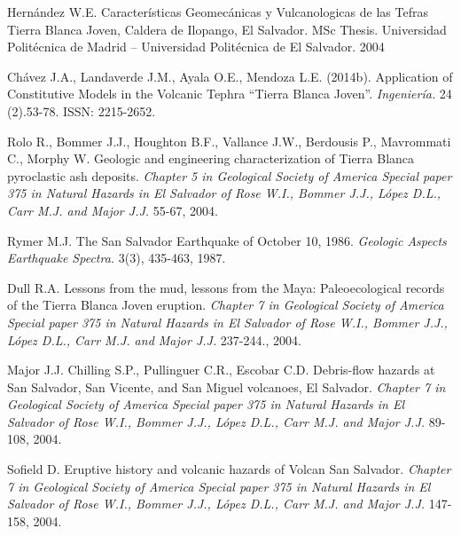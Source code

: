 \documentclass[11pt,twoside]{rmta2010esp}%
\begin{document}
\begin{thebibliography}{99}
Hern\'{a}ndez W.E.
\newblock Características Geomec\'{a}nicas y Vulcanologicas de las Tefras Tierra Blanca Joven, Caldera de Ilopango, El Salvador.
\newblock MSc Thesis. Universidad Politécnica de Madrid – Universidad Polit\'{e}cnica de El Salvador.
 2004


Chávez J.A.,  Landaverde J.M., Ayala O.E., Mendoza L.E. (2014b). 
\newblock Application of Constitutive Models in the Volcanic Tephra ``Tierra Blanca Joven''.
\newblock \emph{Ingeniería.}
  24 (2).53-78.
\newblock  ISSN: 2215-2652.


Rolo R., Bommer J.J., Houghton B.F., Vallance J.W., Berdousis P., Mavrommati C., Morphy W.
\newblock Geologic and engineering characterization of Tierra Blanca pyroclastic ash deposits.
\newblock \emph{Chapter 5 in Geological Society of America Special paper 375 in Natural Hazards in El Salvador of Rose W.I., Bommer J.J., López D.L., Carr M.J. and Major J.J.}
  55-67, 2004.


Rymer M.J. 
\newblock The San Salvador Earthquake of October 10, 1986.
\newblock \emph{Geologic Aspects Earthquake Spectra.}
 3(3), 435-463, 1987.


Dull R.A.
\newblock Lessons from the mud, lessons from the Maya: Paleoecological records of the Tierra Blanca Joven eruption.
\newblock \emph{Chapter 7 in Geological Society of America Special paper 375 in Natural Hazards in El Salvador of Rose W.I., Bommer J.J., López D.L., Carr M.J. and Major J.J.}
 237-244., 2004.

Major J.J. Chilling S.P., Pullinguer C.R., Escobar C.D.
\newblock Debris-flow hazards at San Salvador, San Vicente, and San Miguel volcanoes, El Salvador.
\newblock \emph{Chapter 7 in Geological Society of America Special paper 375 in Natural Hazards in El Salvador of Rose W.I., Bommer J.J., López D.L., Carr M.J. and Major J.J.}
 89-108, 2004.


Sofield D.
\newblock Eruptive history and volcanic hazards of Volcan San Salvador. 
\newblock \emph{Chapter 7 in Geological Society of America Special paper 375 in Natural Hazards in El Salvador of Rose W.I., Bommer J.J., López D.L., Carr M.J. and Major J.J.}
 147-158, 2004.









\end{thebibliography}
\end{document}
